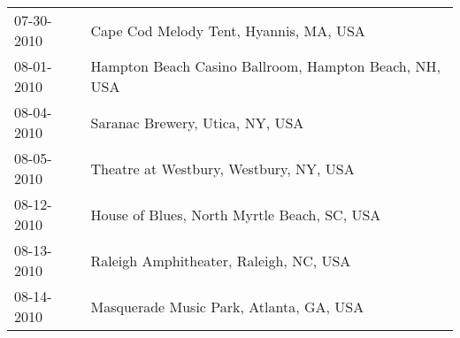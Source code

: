 \begin{supertabular}{ll}
 07-30-2010 &                 Cape Cod Melody Tent, Hyannis, MA, USA \\
 08-01-2010 &  Hampton Beach Casino Ballroom, Hampton Beach, NH, USA \\
 08-04-2010 &                        Saranac Brewery, Utica, NY, USA \\
 08-05-2010 &                 Theatre at Westbury, Westbury, NY, USA \\
 08-12-2010 &            House of Blues, North Myrtle Beach, SC, USA \\
 08-13-2010 &                 Raleigh Amphitheater, Raleigh, NC, USA \\
 08-14-2010 &                Masquerade Music Park, Atlanta, GA, USA \\
\end{supertabular}
